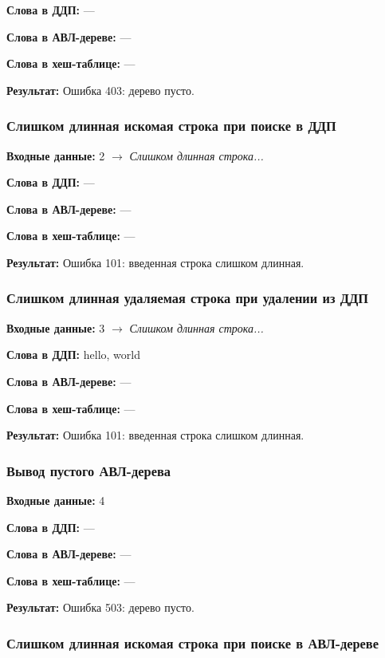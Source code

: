 \documentclass[a4paper,12pt]{extarticle}
\begin{document}
\textbf{Слова в ДДП: }
---

\textbf{Слова в АВЛ-дереве: }
---

\textbf{Слова в хеш-таблице: }
---

\textbf{Результат: }
Ошибка 403: дерево пусто.


\subsubsection{Слишком длинная искомая строка при поиске в ДДП}

\textbf{Входные данные: }
2 $\rightarrow$ \textit{Слишком длинная строка...}

\textbf{Слова в ДДП: }
---

\textbf{Слова в АВЛ-дереве: }
---

\textbf{Слова в хеш-таблице: }
---

\textbf{Результат: }
Ошибка 101: введенная строка слишком длинная.


\subsubsection{Слишком длинная удаляемая строка при удалении из ДДП}

\textbf{Входные данные: }
3 $\rightarrow$ \textit{Слишком длинная строка...}

\textbf{Слова в ДДП: }
hello, world

\textbf{Слова в АВЛ-дереве: }
---

\textbf{Слова в хеш-таблице: }
---

\textbf{Результат: }
Ошибка 101: введенная строка слишком длинная.


\subsubsection{Вывод пустого АВЛ-дерева}

\textbf{Входные данные: }
4

\textbf{Слова в ДДП: }
---

\textbf{Слова в АВЛ-дереве: }
---

\textbf{Слова в хеш-таблице: }
---

\textbf{Результат: }
Ошибка 503: дерево пусто.


\subsubsection{Слишком длинная искомая строка при поиске в АВЛ-дереве}
\end{document}
